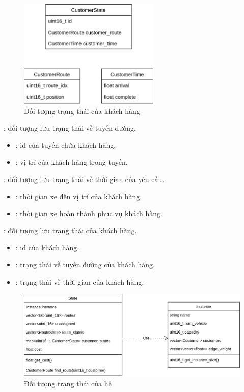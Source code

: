 \begin{figure}[H] %
  \centering %
  \includegraphics[width=0.6\textwidth]{figures/CustomerState.png} 
  \caption{Đối tượng trạng thái của khách hàng} 
  \label{fig:fg_03}
\end{figure}

: đối tượng lưu trạng thái về tuyến đường.
\begin{itemize}
  \item {}: id của tuyến chứa khách hàng.
  \item {}: vị trí của khách hàng trong tuyến.
\end{itemize}

: đối tượng lưu trạng thái về thời gian của yêu cầu.
\begin{itemize}
  \item {}: thời gian xe đến vị trí của khách hàng.
  \item {}: thời gian xe hoàn thành phục vụ khách hàng.
\end{itemize}

: đối tượng lưu trạng thái của khách hàng.
\begin{itemize}
  \item {}: id của khách hàng.
  \item {}: trạng thái về tuyến đường của khách hàng.
  \item {}: trạng thái về thời gian của khách hàng.
\end{itemize}

\begin{figure}[H] %
  \centering %
  \includegraphics[width=1\textwidth]{figures/core-object.png} 
  \caption{Đối tượng trạng thái của hệ} 
  \label{fig:fg_03}
\end{figure}

